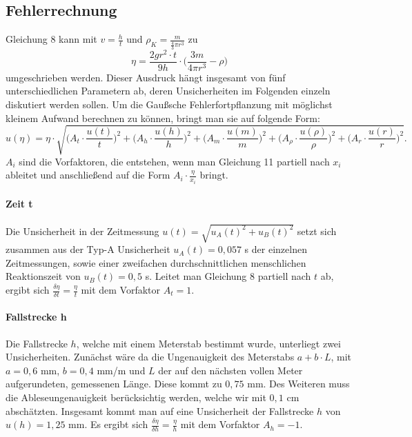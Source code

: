 \documentclass{article}
\begin{document}
\subsection{Fehlerrechnung} 
Gleichung 8 kann mit $v = \frac{h}{t}$ und $\rho_K = \frac{m}{\frac{4}{3} \pi r^3}$ zu
\begin{equation}
    \eta = \frac{2gr^2 \cdot t}{9h} \cdot \bigg(\frac{3m}{4\pi r^3} - \rho \bigg)
\end{equation}
umgeschrieben werden. Dieser Ausdruck hängt insgesamt von fünf unterschiedlichen Parametern ab, deren
Unsicherheiten im Folgenden einzeln diskutiert werden sollen. Um die Gaußsche Fehlerfortpflanzung mit
möglichst kleinem Aufwand berechnen zu können, bringt man sie auf folgende Form:
\begin{equation}
    u(\eta) = \eta \cdot \sqrt{\bigg(A_{t}\cdot \frac{u(t)}{t}\bigg)^2 + \bigg(A_{h}\cdot \frac{u(h)}{h}\bigg)^2 + \bigg(A_{m}\cdot \frac{u(m)}{m}\bigg)^2 + \bigg(A_{\rho}\cdot \frac{u(\rho)}{\rho}\bigg)^2 + \bigg(A_{r}\cdot \frac{u(r)}{r}\bigg)^2}.
\end{equation}
$A_i$ sind die Vorfaktoren, die entstehen, wenn man Gleichung 11 partiell nach $x_i$ ableitet und anschließend
auf die Form $A_i \cdot \frac{\eta}{x_i}$ bringt.
\paragraph{Zeit t}
Die Unsicherheit in der Zeitmessung $u(t) = \sqrt{u_A(t)^2+ u_B(t)^2}$ setzt sich zusammen aus der Typ-A Unsicherheit $ u_A(t)= 0,057$ s der einzelnen Zeitmessungen, sowie einer zweifachen durchschnittlichen menschlichen Reaktionszeit von $u_B(t) = 0,5$ s. Leitet man Gleichung 8 partiell nach $t$ ab, ergibt sich $\frac{\delta \eta}{\delta t} = \frac{\eta}{t}$ mit dem Vorfaktor $A_t = 1$.
\paragraph{Fallstrecke h}
Die Fallstrecke $h$, welche mit einem Meterstab bestimmt wurde, unterliegt zwei Unsicherheiten. Zunächst wäre da die Ungenauigkeit des Meterstabs $a+b \cdot L$, mit $a = 0,6$ mm, $b = 0,4$ mm/m und $L$ der auf den nächsten vollen Meter aufgerundeten, gemessenen Länge. Diese kommt zu $0,75$ mm. Des Weiteren muss die Ableseungenauigkeit berücksichtig werden, welche wir mit $0,1$ cm abschätzten. Insgesamt kommt man auf eine Unsicherheit der Fallstrecke $h$ von $u(h)=1,25$ mm. Es ergibt sich $ \frac{\delta \eta}{\delta h} = \frac{\eta}{h}$ mit dem Vorfaktor $A_h = -1$. 
\end{document}
